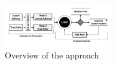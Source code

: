 \begin{figure}[htp]
	\begin{centering}	
	\includegraphics[width=0.42\textwidth, clip]{img/processo}
	\caption{Overview of the approach}
	\label{fig:process}
	\end{centering}
\end{figure}